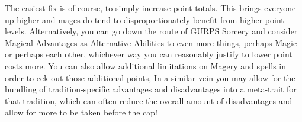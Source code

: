 \begin{multicols*}{2}
	The easiest fix is of course, to simply increase point totals. This brings everyone up higher and mages do tend to disproportionately benefit from higher point levels. Alternatively, you can go down the route of GURPS Sorcery and consider Magical Advantages as Alternative Abilities to even more things, perhaps Magic or perhaps each other, whichever way you can reasonably justify to lower point costs more. You can also allow additional limitations on Magery and spells in order to eek out those additional points, In a similar vein you may allow for the bundling of tradition-specific advantages and disadvantages into a meta-trait for that tradition, which can often reduce the overall amount of disadvantages and allow for more to be taken before the cap!
	
\end{multicols*}